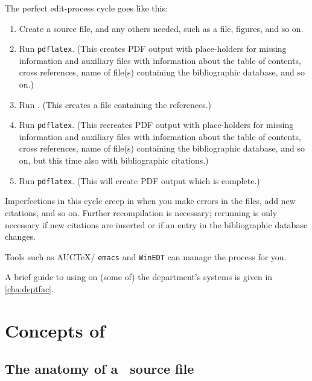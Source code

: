 \documentclass[authoryearcitations]{UoYCSproject}
\begin{document}
The perfect edit-process cycle goes like this:
\begin{enumerate}
\item Create a \LaTeXe{} source file, and any others needed, such as a
  \BibTeX{} file, figures, and so on.
\item Run \lstinline|pdflatex|.  (This creates PDF output with
  place-holders for missing information and auxiliary files with
  information about the table of contents, cross references, name of
  file(s) containing the bibliographic database, and so on.)
\item Run \BibTeX.  (This creates a file containing the references.)
\item Run \lstinline|pdflatex|.  (This recreates PDF output with
  place-holders for missing information and auxiliary files with
  information about the table of contents, cross references, name of
  file(s) containing the bibliographic database, and so on, but this
  time also with bibliographic citations.)
\item Run \lstinline|pdflatex|. (This will create PDF output which is
  complete.)
\end{enumerate}
Imperfections in this cycle creep in when you make errors in the
files, add new citations, and so on.  Further recompilation is
necessary; rerunning \BibTeX{} is only necessary if new citations are
inserted or if an entry in the bibliographic database changes.

Tools such as AUC\TeX{}/ \lstinline|emacs| and \lstinline|WinEDT| can
manage the process for you.

A brief guide to using \LaTeXe{} on (some of) the department's systems
is given in \autoref{cha:deptfac}.



\cleardoublepage
\part{Concepts of \LaTeXe}
\label{sec:middle}
\thispagestyle{empty}\cleardoublepage

\chapter{The anatomy of a \LaTeXe\ source file}
\label{cha:anatomy}
\end{document}
